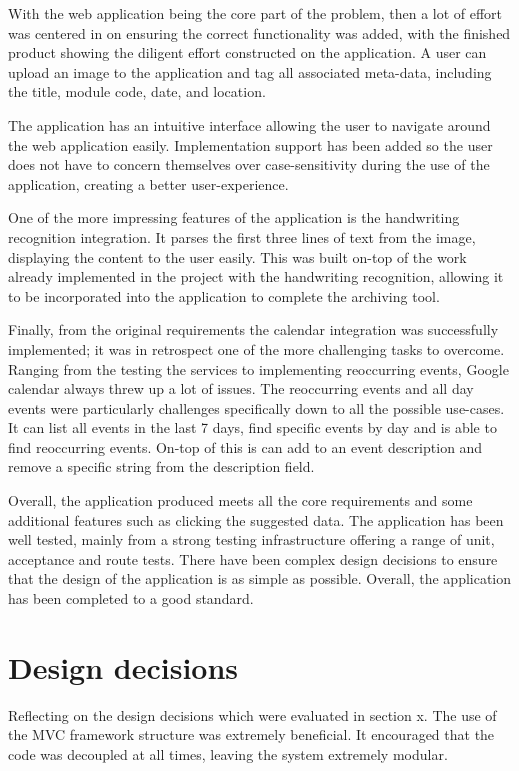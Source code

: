 With the web application being the core part of the problem, then a lot of effort was centered in on ensuring the correct functionality was added, with the finished product showing the diligent effort constructed on the application. A user can upload an image to the application and tag all associated meta-data, including the title, module code, date, and location.

The application has an intuitive interface allowing the user to navigate around the web application easily. Implementation support has been added so the user does not have to concern themselves over case-sensitivity during the use of the application, creating a better user-experience.

One of the more impressing features of the application is the handwriting recognition integration. It parses the first three lines of text from the image, displaying the content to the user easily. This was built on-top of the work already implemented in the project with the handwriting recognition, allowing it to be incorporated into the application to complete the archiving tool.

Finally, from the original requirements the calendar integration was successfully implemented; it was in retrospect one of the more challenging tasks to overcome. Ranging from the testing the services to implementing reoccurring events, Google calendar always threw up a lot of issues. The reoccurring events and all day events were particularly challenges specifically down to all the possible use-cases. It can list all events in the last 7 days, find specific events by day and is able to find reoccurring events. On-top of this is can add to an event description and remove a specific string from the description field.

Overall, the application produced meets all the core requirements and some additional features such as clicking the suggested data. The application has been well tested, mainly from a strong testing infrastructure offering a range of unit, acceptance and route tests. There have been complex design decisions to ensure that the design of the application is as simple as possible. Overall, the application has been completed to a good standard.

\section{Design decisions}
Reflecting on the design decisions which were evaluated in section x. The use of the MVC framework structure was extremely beneficial. It encouraged that the code was decoupled at all times, leaving the system extremely modular.

